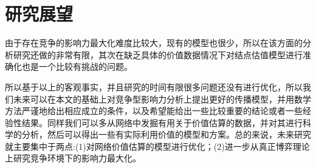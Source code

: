 \section{研究展望}
由于存在竞争的影响力最大化难度比较大，现有的模型也很少，所以在该方面的分析研究还做的非常有限，其次在缺乏具体的价值数据情况下对结点估值模型进行准确化也是一个比较有挑战的问题。

所以基于以上的客观事实，并且研究的时间有限很多问题还没有进行优化，所以我们未来可以在本文的基础上对竞争型影响力分析上提出更好的传播模型，并用数学方法严谨地给出相应成立的条件，以及希望能给出一些比较重要的结论或者一些经验性结果。同样我们可以多从网络中发掘有用关于价值估算的数据，并对其进行科学的分析，然后可以得出一些有实际利用价值的模型和方案。总的来说，未来研究就主要集中于两点:(1)对网络价值估算的模型进行优化；(2)进一步从真正博弈理论上研究竞争环境下的影响力最大化。